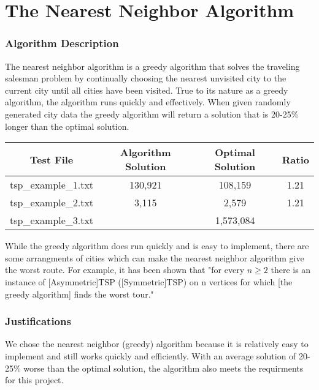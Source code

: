 \documentclass[Group45_Project_Report.tex]{subfiles}
\begin{document}
\part*{The Nearest Neighbor Algorithm}

\section*{Algorithm Description}
The nearest neighbor algorithm is a greedy algorithm that solves the traveling salesman problem by continually choosing the nearest unvisited city to the current city until all cities have been visited. True to its nature as a greedy algorithm, the algorithm runs quickly and effectively. When given randomly generated city data the greedy algorithm will return a solution that is 20-25\% longer than the optimal solution.

\begin{center}
\begin{tabular}{ ||c|c|c|c|| } 
 \hline
 \textbf{Test File} & \textbf{Algorithm Solution} & \textbf{Optimal Solution} & \textbf{Ratio}\\[0.5ex]
 \hline\hline
 tsp\_example\_1.txt & 130,921 & 108,159 & 1.21 \\ 
 \hline
 tsp\_example\_2.txt & 3,115 & 2,579 & 1.21 \\ 
 \hline
 tsp\_example\_3.txt &  & 1,573,084 &  \\ 
 \hline
\end{tabular}
\end{center}

While the greedy algorithm does run quickly and is easy to implement, there are some arrangments of cities which can make the nearest neighbor algorithm give the worst route. For example, it has been shown that "for every $n \geq 2$ there is an instance of [Asymmetric]TSP ([Symmetric]TSP) on n vertices for which [the greedy algorithm] finds the worst tour."~\cite{Gutin}

\section*{Justifications}
We chose  the nearest neighbor (greedy) algorithm because it is relatively easy to implement and still works quickly and efficiently. With an average solution of 20-25\% worse than the optimal solution, the algorithm also meets the requirments for this project. 
\end{document}
